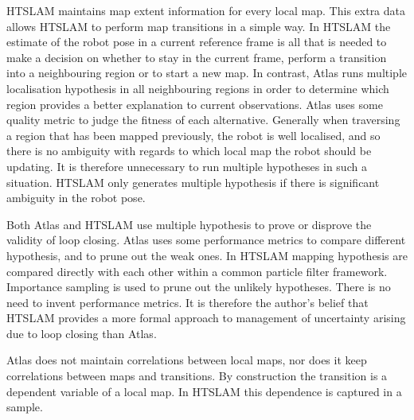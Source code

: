 
HTSLAM maintains map extent information for every local map. This
extra data allows HTSLAM to perform map transitions in a simple
way. In HTSLAM the estimate of the robot pose in a current reference
frame is all that is needed to make a decision on whether to stay in
the current frame, perform a transition into a neighbouring region or
to start a new map. In contrast, Atlas runs multiple localisation
hypothesis in all neighbouring regions in order to determine which
region provides a better explanation to current observations. Atlas
uses some quality metric to judge the fitness of each
alternative. Generally when traversing a region that has been mapped
previously, the robot is well localised, and so there is no ambiguity with
regards to which local map the robot should be updating. It is therefore
unnecessary to run multiple hypotheses in such a situation. HTSLAM only
generates multiple hypothesis if there is significant ambiguity in the
robot pose.


Both Atlas and HTSLAM use multiple hypothesis to prove or disprove
the validity of loop closing. Atlas uses some performance metrics to
compare different hypothesis, and to prune out the weak ones. In
HTSLAM mapping hypothesis are compared directly with each other within
a common particle filter framework. Importance
sampling is used to prune out the unlikely hypotheses. There is no
need to invent performance metrics. It is therefore the author's belief
that HTSLAM provides a more formal approach to management of
uncertainty arising due to loop closing than Atlas.



Atlas does not maintain correlations between local maps, nor does it
keep correlations between maps and transitions. By construction the
transition is a dependent variable of a local map. In HTSLAM this
dependence is captured in a sample.





